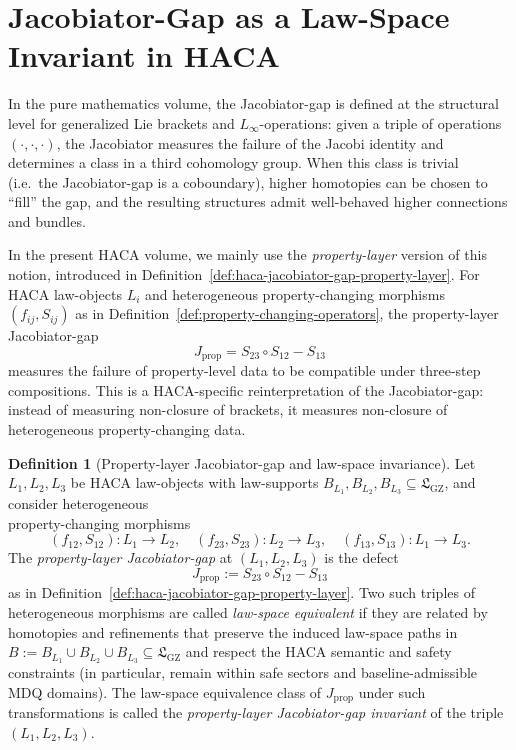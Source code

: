 \documentclass[11pt]{book}
\theoremstyle{plain}
\theoremstyle{definition}
\newtheorem{definition}[theorem]{Definition}
\theoremstyle{remark}
\newcommand{\GZLS}{\ensuremath{\mathfrak{L}_{\mathrm{GZ}}}}       \newcommand{\GZLT}{\ensuremath{M_{!w}}}                           \newcommand{\GZLOC}{\ensuremath{A_M}}                             \newcommand{\GZLC}{\ensuremath{\omega_{\mathrm{law}}}}            \newcommand{\GZLCurv}{\ensuremath{\mathcal{F}_{\mathrm{law}}}}
\begin{document}
\section[Jacobiator-Gap as a Law-Space Invariant in HACA]{Jacobiator-Gap as a Law-Space Invariant in HACA}


In the pure mathematics volume, the Jacobiator-gap is defined at the
structural level for generalized Lie brackets and $L_\infty$-operations:
given a triple of operations $(\cdot,\cdot,\cdot)$, the Jacobiator
measures the failure of the Jacobi identity and determines a class in
a third cohomology group. When this class is trivial (i.e.\ the
Jacobiator-gap is a coboundary), higher homotopies can be chosen to
``fill'' the gap, and the resulting structures admit well-behaved
higher connections and bundles.

In the present HACA volume, we mainly use the \emph{property-layer}
version of this notion, introduced in
Definition~\ref{def:haca-jacobiator-gap-property-layer}. For HACA
law-objects $L_i$ and heterogeneous property-changing morphisms
$(f_{ij},S_{ij})$ as in
Definition~\ref{def:property-changing-operators}, the property-layer
Jacobiator-gap
\[
  J_{\mathrm{prop}}
  =
  S_{23}\circ S_{12} - S_{13}
\]
measures the failure of property-level data to be compatible under
three-step compositions. This is a HACA-specific reinterpretation of
the Jacobiator-gap: instead of measuring non-closure of brackets, it
measures non-closure of heterogeneous property-changing data.

\begin{definition}[Property-layer Jacobiator-gap and law-space invariance]
\label{def:haca-jacobiator-gap-invariant}
Let $L_1,L_2,L_3$ be HACA law-objects with law-supports
$B_{L_1},B_{L_2},B_{L_3}\subseteq\GZLS$, and consider heterogeneous\\
property-changing morphisms
\[
  (f_{12},S_{12}):L_1\to L_2,
  \quad
  (f_{23},S_{23}):L_2\to L_3,
  \quad
  (f_{13},S_{13}):L_1\to L_3.
\]
The \emph{property-layer Jacobiator-gap} at $(L_1,L_2,L_3)$ is the
defect
\[
  J_{\mathrm{prop}}
  :=
  S_{23}\circ S_{12} - S_{13}
\]
as in Definition~\ref{def:haca-jacobiator-gap-property-layer}. Two
such triples of heterogeneous morphisms are called \emph{law-space
equivalent} if they are related by homotopies and refinements that
preserve the induced law-space paths in
$B:=B_{L_1}\cup B_{L_2}\cup B_{L_3}\subseteq\GZLS$ and respect the
HACA semantic and safety constraints (in particular, remain within
safe sectors and baseline-admissible MDQ domains). The law-space
equivalence class of $J_{\mathrm{prop}}$ under such transformations
is called the \emph{property-layer Jacobiator-gap invariant} of the
triple $(L_1,L_2,L_3)$.
\end{definition}
\end{document}
